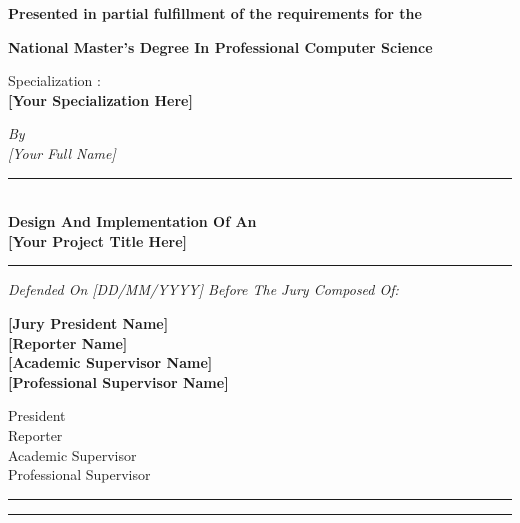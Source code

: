 \documentclass[12pt,a4paper,oneside,openany]{report}
\begin{document}
\begin{titlepage}
\begin{center}
  \vspace{0.8cm}
  {\small\bfseries Presented in partial fulfillment of the requirements for the}

  \vspace{0.6cm}
  {\Large\bfseries National Master's Degree In Professional Computer Science}

  \vspace{0.6cm}
  {\small Specialization :}\\[6pt]
  {\large\bfseries [Your Specialization Here]}

  \vspace{0.8cm}
  {\small\itshape By}\\[6pt]
  {\large\itshape [Your Full Name]}

  \vspace{0.8cm}

  {\color{primaryblue}\rule{0.6\linewidth}{1pt}}\\[16pt]
  {\LARGE\bfseries Design And Implementation Of An\\[8pt]
   [Your Project Title Here]}\\[16pt]
  {\color{primaryblue}\rule{0.6\linewidth}{1pt}}

  \vspace{0.8cm}
  {\small\itshape Defended On [DD/MM/YYYY] Before The Jury Composed Of:}

  \vspace{0.5cm}

\end{center}

\noindent
\begin{minipage}[t]{0.55\textwidth}
  \textbf{[Jury President Name]}\\[8pt]
  \textbf{[Reporter Name]}\\[8pt]
  \textbf{[Academic Supervisor Name]}\\[8pt]
  \textbf{[Professional Supervisor Name]}
\end{minipage}%
\hfill
\begin{minipage}[t]{0.40\textwidth}\raggedleft
  President\\[8pt]
  Reporter\\[8pt]
  Academic Supervisor\\[8pt]
  Professional Supervisor
\end{minipage}

\vfill
\begin{center}
  \rule{2cm}{0.4pt}\quad\rule{2cm}{0.4pt}
\end{center}

\restoregeometry
\end{titlepage}
\end{document}
